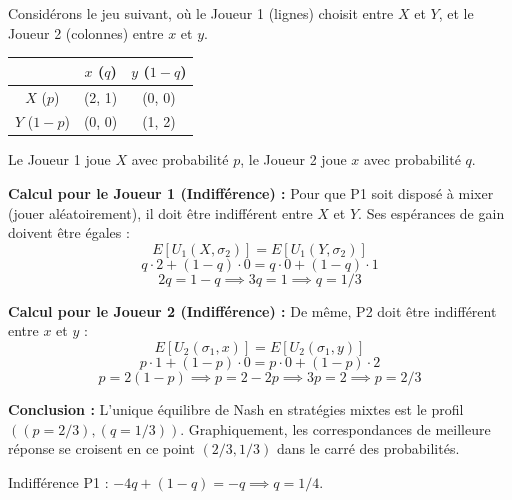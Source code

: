 \begin{exemple}
Considérons le jeu suivant, où le Joueur 1 (lignes) choisit entre $X$ et $Y$, et le Joueur 2 (colonnes) entre $x$ et $y$.
\begin{center}
\begin{tabular}{c|c|c}
 & $x$ ($q$) & $y$ ($1-q$) \\ \hline
$X$ ($p$) & (2, 1) & (0, 0) \\ \hline
$Y$ ($1-p$) & (0, 0) & (1, 2)
\end{tabular}
\end{center}
Le Joueur 1 joue $X$ avec probabilité $p$, le Joueur 2 joue $x$ avec probabilité $q$.

\textbf{Calcul pour le Joueur 1 (Indifférence) :}
Pour que P1 soit disposé à mixer (jouer aléatoirement), il doit être indifférent entre $X$ et $Y$. Ses espérances de gain doivent être égales :
\[ E[U_1(X, \sigma_2)] = E[U_1(Y, \sigma_2)] \]
\[ q \cdot 2 + (1-q) \cdot 0 = q \cdot 0 + (1-q) \cdot 1 \]
\[ 2q = 1 - q \implies 3q = 1 \implies q = 1/3 \]

\textbf{Calcul pour le Joueur 2 (Indifférence) :}
De même, P2 doit être indifférent entre $x$ et $y$ :
\[ E[U_2(\sigma_1, x)] = E[U_2(\sigma_1, y)] \]
\[ p \cdot 1 + (1-p) \cdot 0 = p \cdot 0 + (1-p) \cdot 2 \]
\[ p = 2(1 - p) \implies p = 2 - 2p \implies 3p = 2 \implies p = 2/3 \]

\textbf{Conclusion :} L'unique équilibre de Nash en stratégies mixtes est le profil $((p=2/3), (q=1/3))$.
Graphiquement, les correspondances de meilleure réponse se croisent en ce point $(2/3, 1/3)$ dans le carré des probabilités.
\end{exemple}

\begin{exemple}
Indifférence P1 : $-4q + (1-q) = -q \implies q = 1/4$.
\end{exemple}
